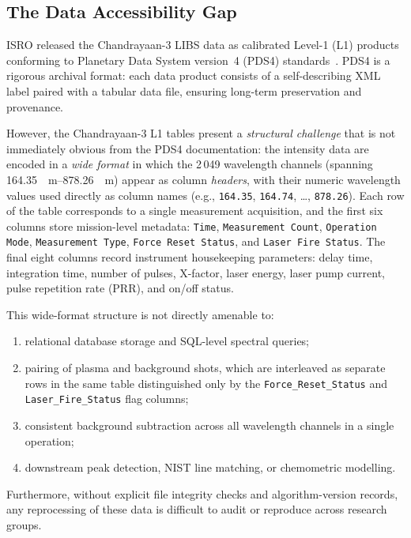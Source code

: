 \documentclass[a4paper,twocolumn,10pt]{article}
\begin{document}
\subsection{The Data Accessibility Gap}

ISRO released the Chandrayaan-3 LIBS data as calibrated Level-1 (L1)
products conforming to Planetary Data System version~4 (PDS4)
standards~\cite{Hughes2018}.  PDS4 is a rigorous archival format: each
data product consists of a self-describing XML label paired with a
tabular data file, ensuring long-term preservation and provenance.

However, the Chandrayaan-3 L1 tables present a \emph{structural
challenge} that is not immediately obvious from the PDS4 documentation:
the intensity data are encoded in a \emph{wide format} in which the
2\,049 wavelength channels (spanning \SIrange{164.35}{878.26}{\nano
\metre}) appear as column \emph{headers}, with their numeric wavelength
values used directly as column names (e.g., \texttt{164.35},
\texttt{164.74}, \ldots, \texttt{878.26}).  Each row of the table
corresponds to a single measurement acquisition, and the first six
columns store mission-level metadata: \texttt{Time},
\texttt{Measurement Count}, \texttt{Operation Mode},
\texttt{Measurement Type}, \texttt{Force Reset Status}, and
\texttt{Laser Fire Status}.  The final eight columns record instrument
housekeeping parameters: delay time, integration time, number of
pulses, X-factor, laser energy, laser pump current, pulse repetition
rate (PRR), and on/off status.

This wide-format structure is not directly amenable to:
\begin{enumerate}[nosep,leftmargin=*]
  \item relational database storage and SQL-level spectral queries;
  \item pairing of plasma and background shots, which are interleaved
    as separate rows in the same table distinguished only by the
    \texttt{Force\_Reset\_Status} and \texttt{Laser\_Fire\_Status}
    flag columns;
  \item consistent background subtraction across all wavelength
    channels in a single operation;
  \item downstream peak detection, NIST line matching, or
    chemometric modelling.
\end{enumerate}

Furthermore, without explicit file integrity checks and
algorithm-version records, any reprocessing of these data is
difficult to audit or reproduce across research groups.
\end{document}
